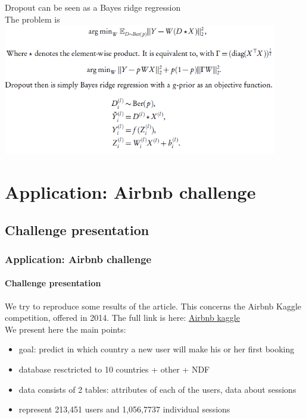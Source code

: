 \documentclass{beamer}
\begin{document}
\begin{frame}
Dropout can be seen as a Bayes ridge regression
\\
The problem is 
\includegraphics[width=0.9\textwidth]{images/drop_out_7.PNG} \\
\end{frame}

\section{Application: Airbnb challenge}
\subsection{Challenge presentation}
\begin{frame}
\frametitle{Application: Airbnb challenge}
\framesubtitle{Challenge presentation}
We try to reproduce some results of the article. This concerns the Airbnb Kaggle competition, offered in 2014.
The full link is here: 
\href{https://www.kaggle.com/c/airbnb-recruiting-new-user-bookings}{Airbnb kaggle}
\\
We present here the main points:
\begin{itemize}
\item goal: predict in which country a new user will make his or her first booking
\item database resctricted to 10 countries + other + NDF
\item data consists of 2 tables: attributes of each of the users, data about sessions 
\item  represent 213,451 users and 1,056,7737 individual sessions
\end{itemize}
\end{frame}
\end{document}

